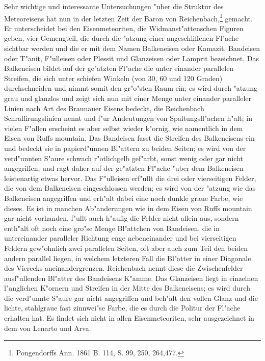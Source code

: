 \documentclass[a4paper, 11pt, oneside]{article}
\begin{document}
Sehr wichtige und interessante Untersuchungen "uber die Struktur des Meteoreisens hat nun in der letzten Zeit der Baron von Reichenbach,\footnote{Pongendorffs Ann. 1861 B. 114, S. 99, 250, 264,477.} gemacht. Er unterscheidet bei den Eisenmeteoriten, die Widmanst"attenschen Figuren geben, vier Gemengteil, die durch die "atzung einer angeschliffenen Fl"ache sichtbar werden und die er mit dem Namen Balkeneisen oder Kamazit, Bandeisen oder T"anit, F"ulleisen oder Plessit und Glanzeisen oder Lamprit bezeichnet. Das Balkeneisen bildet auf der ge"atzten Fl"ache die unter einander parallelen Streifen, die sich unter schiefen Winkeln (von 30, 60 und 120 Graden) durchschneiden und nimmt somit den gr"o"sten Raum ein; es wird durch "atzung grau und glanzlos und zeigt sich nun mit einer Menge unter einander paralleler Linien nach Art des Braunauer Eisens bedeckt, die Reichenbach Schraffirungslinien nennt und f"ur Andeutungen von Spaltungsfl"achen h"alt; in vielen F"allen erscheint es aber selbst wieder k"ornig, wie namentlich in dem Eisen von Ruffs mountain. Das Bandeisen fasst die Streifen des Balkeneisens ein und bedeckt sie in papierd"unnen Bl"attern zu beiden Seiten; es wird von der verd"unnten S"aure schwach r"otlichgelb gef"arbt, sonst wenig oder gar nicht angegriffen, und ragt daher auf der ge"atzten Fl"ache "uber dem Balkeneisen leistenartig etwas hervor. Das F"ulleisen erf"ullt die drei oder vierseitigen Felder, die von dem Balkeneisen eingeschlossen werden; es wird von der "atzung wie das Balkeneisen angegriffen und erh"alt dabei eine noch dunkle graue Farbe, wie dieses. Es ist in manchen Ab"anderungen wie in dem Eisen von Ruffs mountain gar nicht vorhanden, f"ullt auch h"aufig die Felder nicht allein aus, sondern enth"alt oft noch eine gro"se Menge Bl"attchen von Bandeisen, die in untereinander paralleler Richtung enge nebeneinander und bei vierseitigen Feldern gew"ohnlich zwei parallelen Seiten, oft aber auch zum Teil den beiden andern parallel liegen, in welchem letzteren Fall die Bl"atter in einer Diagonale des Vierecks aneinandergrenzen. Reichenbach nennt diese die Zwischenfelder ausf"ullenden Bl"atter des Bandeisens K"amme. Das Glanzeisen liegt in einzelnen l"anglichen K"ornern und Streifen in der Mitte des Balkeneisens; es wird durch die verd"unnte S"aure gar nicht angegriffen und beh"alt den vollen Glanz und die lichte, stahlgraue fast zinnwei"se Farbe, die es durch die Politur der Fl"ache erhalten hat. Es findet sich nicht in allen Eisenmeteoriten, sehr ausgezeichnet in dem von Lenarto und Arva.
\end{document}
